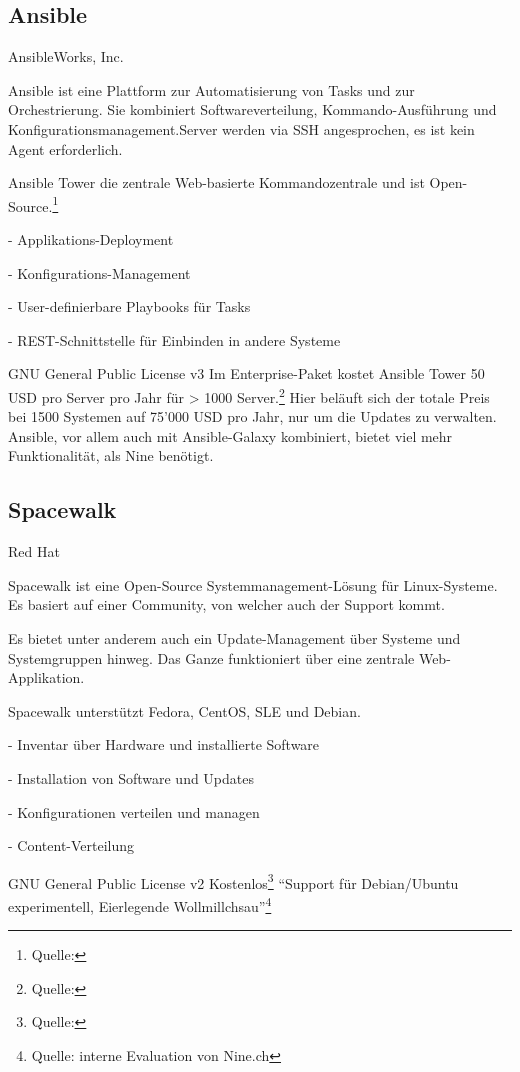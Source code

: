 \subsection*{Ansible}

{AnsibleWorks, Inc.}
{Ansible ist eine Plattform zur Automatisierung von Tasks und zur Orchestrierung. Sie kombiniert Softwareverteilung, Kommando-Ausführung und Konfigurationsmanagement.Server werden via SSH angesprochen, es ist kein Agent erforderlich.

Ansible Tower die zentrale Web-basierte Kommandozentrale und ist Open-Source.\footnote{Quelle: }}
{
- Applikations-Deployment

- Konfigurations-Management

- User-definierbare Playbooks für Tasks

- REST-Schnittstelle für Einbinden in andere Systeme
}
{GNU General Public License v3}
{Im Enterprise-Paket kostet Ansible Tower 50 USD pro Server pro Jahr für > 1000 Server.\footnote{Quelle: }}
{}
{Hier beläuft sich der totale Preis bei 1500 Systemen auf 75'000 USD pro Jahr, nur um die Updates zu verwalten. Ansible, vor allem auch mit Ansible-Galaxy kombiniert, bietet viel mehr Funktionalität, als Nine benötigt.}

\subsection*{Spacewalk}

{Red Hat}
{Spacewalk ist eine Open-Source Systemmanagement-Lösung für Linux-Systeme. Es basiert auf einer Community, von welcher auch der Support kommt.

Es bietet unter anderem auch ein Update-Management über Systeme und Systemgruppen hinweg. Das Ganze funktioniert über eine zentrale Web-Applikation.

Spacewalk unterstützt Fedora, CentOS, SLE und Debian.}
{
- Inventar über Hardware und installierte Software

- Installation von Software und Updates

- Konfigurationen verteilen und managen

- Content-Verteilung
}
{GNU General Public License v2}
{Kostenlos\footnote{Quelle: }}
{}
{``Support für Debian/Ubuntu experimentell, Eierlegende Wollmillchsau''\footnote{Quelle: interne Evaluation von Nine.ch}}

